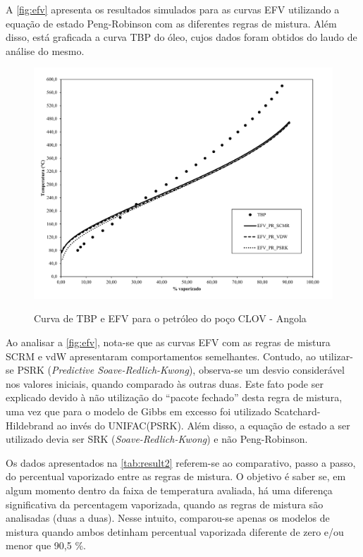 A \autoref{fig:efv} apresenta os resultados simulados para as curvas EFV
utilizando a equação de estado Peng-Robinson com as diferentes regras de
mistura. Além disso, está graficada a curva TBP do óleo, cujos dados foram
obtidos do laudo de análise do mesmo.
\clearpage

\begin{figure}[htb]
\centering
{\includegraphics[width=1.0\textwidth]{img/trab3.pdf}} 
\caption{Curva de TBP e EFV para o petróleo do poço CLOV - Angola}
\label{fig:efv}
\end{figure} 


Ao analisar a \autoref{fig:efv}, nota-se que as curvas EFV com as regras de
mistura SCRM e vdW apresentaram comportamentos semelhantes. Contudo, ao
utilizar-se PSRK (\emph{Predictive Soave-Redlich-Kwong}), observa-se um desvio
considerável nos valores iniciais, quando comparado às outras duas. Este fato pode ser explicado devido à não utilização
do ``pacote fechado'' desta regra de mistura, uma vez que para o modelo de Gibbs
em excesso foi utilizado Scatchard-Hildebrand ao invés do UNIFAC(PSRK). Além
disso, a equação de estado a ser utilizado devia ser SRK
(\emph{Soave-Redlich-Kwong}) e não Peng-Robinson.

Os dados apresentados na \autoref{tab:result2} referem-se ao comparativo, passo
a passo, do percentual vaporizado entre as regras de mistura. O objetivo é saber
se, em algum momento dentro da faixa de temperatura avaliada, há uma
diferença significativa da percentagem vaporizada, quando as regras de mistura
são analisadas (duas a duas). Nesse intuito, comparou-se apenas os modelos de
mistura quando ambos detinham percentual vaporizada diferente de zero e/ou menor
que 90,5 {\%}.

